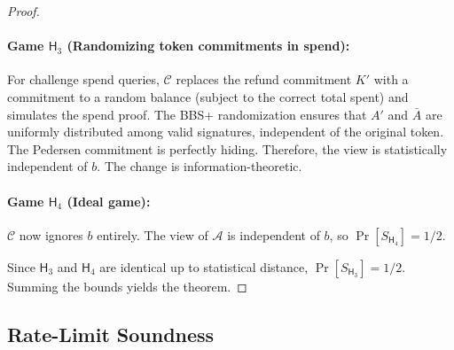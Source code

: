 \documentclass[11pt]{article}
\theoremstyle{definitionstyle}
\theoremstyle{plain}
\begin{document}
\begin{proof}
\paragraph{Game $\mathsf{H}_3$ (Randomizing token commitments in spend):} For challenge spend queries, $\mathcal{C}$ replaces the refund commitment $K'$ with a commitment to a random balance (subject to the correct total spent) and simulates the spend proof. The BBS+ randomization ensures that $A'$ and $\bar{A}$ are uniformly distributed among valid signatures, independent of the original token. The Pedersen commitment is perfectly hiding. Therefore, the view is statistically independent of $b$. The change is information-theoretic.

\paragraph{Game $\mathsf{H}_4$ (Ideal game):} $\mathcal{C}$ now ignores $b$ entirely. The view of $\mathcal{A}$ is independent of $b$, so $\Pr[S_{\mathsf{H}_4}] = 1/2$.

Since $\mathsf{H}_3$ and $\mathsf{H}_4$ are identical up to statistical distance, $\Pr[S_{\mathsf{H}_3}] = 1/2$. Summing the bounds yields the theorem.
\end{proof}

\subsection{Rate-Limit Soundness}
\end{document}
